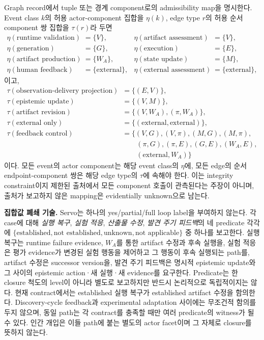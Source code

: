 \documentclass[11pt]{article}
\begin{document}
Graph record에서 tuple 또는 경계 component로의 admissibility map을 명시한다. Event class $k$의 허용 actor-component 집합을 $\eta(k)$, edge type $r$의 허용 순서 component 쌍 집합을 $\tau(r)$라 두면
{\footnotesize
\begin{align}
\eta(\text{runtime validation})&=\{V\}, & \eta(\text{artifact assessment})&=\{V\}, \nonumber\\
\eta(\text{generation})&=\{G\}, & \eta(\text{execution})&=\{E\}, \nonumber\\
\eta(\text{artifact production})&=\{W_A\}, & \eta(\text{state update})&=\{M\}, \nonumber\\
\eta(\text{human feedback})&=\{\mathrm{external}\}, &
\eta(\text{external assessment})&=\{\mathrm{external}\},
\label{eq:event-component-map}
\end{align}
이고,
\begin{align}
\tau(\text{observation-delivery projection})&=\{(E,V)\}, \nonumber\\
\tau(\text{epistemic update})&=\{(V,M)\}, \nonumber\\
\tau(\text{artifact revision})&=\{(V,W_A),(\pi,W_A)\}, \nonumber\\
\tau(\text{external only})&=\{(\mathrm{external},\mathrm{external})\}, \nonumber\\
\tau(\text{feedback control})&=\{(V,G),(V,\pi),(M,G),(M,\pi),\nonumber\\
&\qquad (\pi,G),(\pi,E),(G,E),(W_A,E),\nonumber\\
&\qquad (\mathrm{external},W_A)\}
\label{eq:edge-component-map}
\end{align}
}
이다. 모든 event의 actor component는 해당 event class의 $\eta$에, 모든 edge의 순서 endpoint-component 쌍은 해당 edge type의 $\tau$에 속해야 한다. 이는 integrity constraint이지 제한된 출처에서 모든 component 호출이 관측된다는 주장이 아니며, 출처가 보고하지 않은 mapping은 evidentially unknown으로 남는다.

\noindent\textbf{집합값 폐쇄 기술.}
Servo는 하나의 yes/partial/full loop label을 부여하지 않는다. 각 case에 대해 \emph{실행 복구}, \emph{실험 적응}, \emph{산출물 수정}, \emph{발견 주기 피드백}의 네 predicate 각각에 $\{\text{established},\text{not established},\text{unknown},\text{not applicable}\}$ 중 하나를 보고한다. 실행 복구는 runtime failure evidence, $W_A$를 통한 artifact 수정과 후속 실행을, 실험 적응은 평가 evidence가 변경된 실험 행동을 제어하고 그 행동이 후속 실행되는 path를, artifact 수정은 successor version을, 발견 주기 피드백은 명시적 epistemic update와 그 사이의 epistemic action·새 실행·새 evidence를 요구한다. Predicate는 한 closure 척도의 level이 아니라 별도로 보고하지만 반드시 논리적으로 독립적이지는 않다. 현재 contract에서는 established 실행 복구가 established artifact 수정을 함의한다. Discovery-cycle feedback과 experimental adaptation 사이에는 무조건적 함의를 두지 않으며, 동일 path는 각 contract를 충족할 때만 여러 predicate의 witness가 될 수 있다. 인간 개입은 이들 path에 붙는 별도의 actor facet이며 그 자체로 closure를 뜻하지 않는다.
\end{document}
